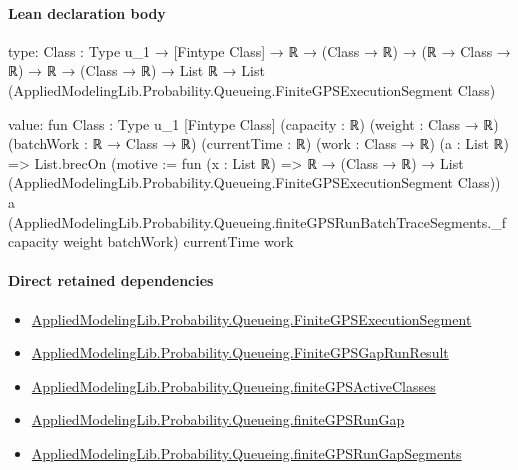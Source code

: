 \documentclass[10pt]{article}
\begin{document}
\paragraph{Lean declaration body}
\begin{ReviewVerbatim}
type:
{Class : Type u_1} →
  [Fintype Class] →
    ℝ →
      (Class → ℝ) →
        (ℝ → Class → ℝ) →
          ℝ → (Class → ℝ) → List ℝ → List (AppliedModelingLib.Probability.Queueing.FiniteGPSExecutionSegment Class)

value:
fun {Class : Type u_1} [Fintype Class] (capacity : ℝ) (weight : Class → ℝ) (batchWork : ℝ → Class → ℝ) (currentTime : ℝ)
    (work : Class → ℝ) (a : List ℝ) =>
  List.brecOn (motive := fun (x : List ℝ) =>
    ℝ → (Class → ℝ) → List (AppliedModelingLib.Probability.Queueing.FiniteGPSExecutionSegment Class)) a
    (AppliedModelingLib.Probability.Queueing.finiteGPSRunBatchTraceSegments._f capacity weight batchWork) currentTime
    work
\end{ReviewVerbatim}

\paragraph{Direct retained dependencies}
\begin{itemize}\raggedright
\item \hyperlink{governing-declaration-5fc1a8f6958b6ad7}{Applied\allowbreak{}Modeling\allowbreak{}Lib.\allowbreak{}Probability.\allowbreak{}Queueing.\allowbreak{}Finite\allowbreak{}GPS\allowbreak{}Execution\allowbreak{}Segment}
\item \hyperlink{governing-declaration-c9a7944bee91fb5d}{Applied\allowbreak{}Modeling\allowbreak{}Lib.\allowbreak{}Probability.\allowbreak{}Queueing.\allowbreak{}Finite\allowbreak{}GPS\allowbreak{}Gap\allowbreak{}Run\allowbreak{}Result}
\item \hyperlink{governing-declaration-c54ef048a5ce0276}{Applied\allowbreak{}Modeling\allowbreak{}Lib.\allowbreak{}Probability.\allowbreak{}Queueing.\allowbreak{}finite\allowbreak{}GPS\allowbreak{}Active\allowbreak{}Classes}
\item \hyperlink{governing-declaration-cf88d64d8dfce082}{Applied\allowbreak{}Modeling\allowbreak{}Lib.\allowbreak{}Probability.\allowbreak{}Queueing.\allowbreak{}finite\allowbreak{}GPS\allowbreak{}Run\allowbreak{}Gap}
\item \hyperlink{governing-declaration-8fe3fa25181e0f94}{Applied\allowbreak{}Modeling\allowbreak{}Lib.\allowbreak{}Probability.\allowbreak{}Queueing.\allowbreak{}finite\allowbreak{}GPS\allowbreak{}Run\allowbreak{}Gap\allowbreak{}Segments}
\end{itemize}
\hypertarget{governing-declaration-388e9f6657f9de1b}{}
\end{document}
